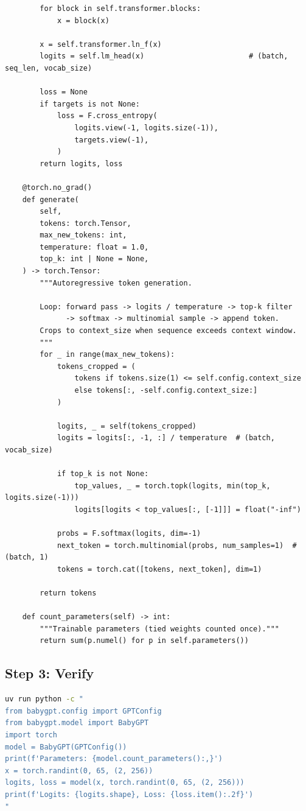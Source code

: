 \begin{lstlisting}
        for block in self.transformer.blocks:
            x = block(x)

        x = self.transformer.ln_f(x)
        logits = self.lm_head(x)                        # (batch, seq_len, vocab_size)

        loss = None
        if targets is not None:
            loss = F.cross_entropy(
                logits.view(-1, logits.size(-1)),
                targets.view(-1),
            )
        return logits, loss

    @torch.no_grad()
    def generate(
        self,
        tokens: torch.Tensor,
        max_new_tokens: int,
        temperature: float = 1.0,
        top_k: int | None = None,
    ) -> torch.Tensor:
        """Autoregressive token generation.

        Loop: forward pass -> logits / temperature -> top-k filter
              -> softmax -> multinomial sample -> append token.
        Crops to context_size when sequence exceeds context window.
        """
        for _ in range(max_new_tokens):
            tokens_cropped = (
                tokens if tokens.size(1) <= self.config.context_size
                else tokens[:, -self.config.context_size:]
            )

            logits, _ = self(tokens_cropped)
            logits = logits[:, -1, :] / temperature  # (batch, vocab_size)

            if top_k is not None:
                top_values, _ = torch.topk(logits, min(top_k, logits.size(-1)))
                logits[logits < top_values[:, [-1]]] = float("-inf")

            probs = F.softmax(logits, dim=-1)
            next_token = torch.multinomial(probs, num_samples=1)  # (batch, 1)
            tokens = torch.cat([tokens, next_token], dim=1)

        return tokens

    def count_parameters(self) -> int:
        """Trainable parameters (tied weights counted once)."""
        return sum(p.numel() for p in self.parameters())
\end{lstlisting}

\subsection{Step 3: Verify}

\shelltag
\begin{lstlisting}[language=bash]
uv run python -c "
from babygpt.config import GPTConfig
from babygpt.model import BabyGPT
import torch
model = BabyGPT(GPTConfig())
print(f'Parameters: {model.count_parameters():,}')
x = torch.randint(0, 65, (2, 256))
logits, loss = model(x, torch.randint(0, 65, (2, 256)))
print(f'Logits: {logits.shape}, Loss: {loss.item():.2f}')
"
\end{lstlisting}

